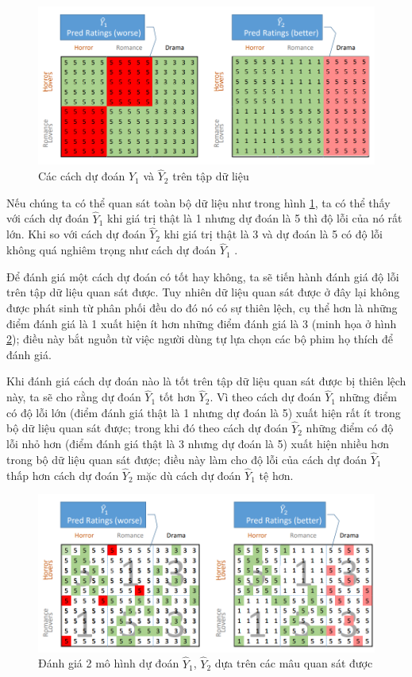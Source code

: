 \begin{figure}[h]
    \centering
    \includegraphics[width=\textwidth]{Chapter1/example_bias_2.png}
    \caption{Các cách dự đoán $\hat{Y}_1$ và $\hat{Y}_2$ trên tập dữ liệu}
    \label{fig:chap1_ex_2}
\end{figure}

Nếu chúng ta có thể quan sát toàn bộ dữ liệu như trong hình \ref{fig:chap1_ex_2}, ta có thể thấy với cách dự đoán $\hat{Y}_1$ khi giá trị thật là 1 nhưng dự đoán là 5 thì độ lỗi của nó rất lớn. Khi so với cách dự đoán $\hat{Y}_2$ khi giá trị thật là 3 và dự đoán là 5 có độ lỗi không quá nghiêm trọng như cách dự đoán $\hat{Y}_1$ .

Để đánh giá một cách dự đoán có tốt hay không, ta sẽ tiến hành đánh giá độ lỗi trên tập dữ liệu quan sát được. Tuy nhiên dữ liệu quan sát được ở đây lại không được phát sinh từ phân phối đều do đó nó có sự thiên lệch, cụ thể hơn là những điểm đánh giá là 1 xuất hiện ít hơn những điểm đánh giá là 3 (minh họa ở hình \ref{fig:chap1_ex_3}); điều này bắt nguồn từ việc người dùng tự lựa chọn các bộ phim họ thích để đánh giá.

Khi đánh giá cách dự đoán nào là tốt trên tập dữ liệu quan sát được bị thiên lệch này, ta sẽ cho rằng dự đoán $\hat{Y}_1$ tốt hơn $\hat{Y}_2$. Vì theo cách dự đoán $\hat{Y}_1$ những điểm có độ lỗi lớn (điểm đánh giá thật là 1 nhưng dự đoán là 5) xuất hiện rất ít trong bộ dữ liệu quan sát được; trong khi đó theo cách dự đoán $\hat{Y}_2$ những điểm có độ lỗi nhỏ hơn (điểm đánh giá thật là 3 nhưng dự đoán là 5) xuất hiện nhiều hơn trong bộ dữ liệu quan sát được; điều này làm cho độ lỗi của cách dự đoán $\hat{Y}_1$ thấp hơn cách dự đoán $\hat{Y}_2$ mặc dù cách dự đoán $\hat{Y}_1$ tệ hơn. 

\begin{figure}[h]
    \centering
    \includegraphics[width=\textwidth]{Chapter1/example_bias_3.png}
    \caption{Đánh giá 2 mô hình dự đoán $\hat{Y}_1$, $\hat{Y}_2$ dựa trên các mâu quan sát được }
    \label{fig:chap1_ex_3}
\end{figure}

